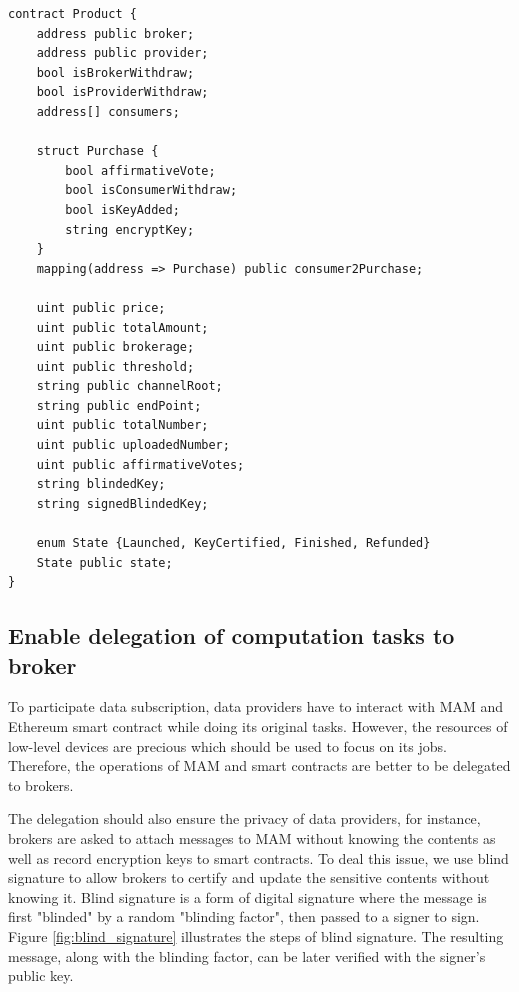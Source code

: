 \documentclass[conference]{IEEEtran}
\begin{document}
\lstset{style=solidity}
\begin{lstlisting}[caption={Product Contract data fields}, label={lst:constructor}, frame=single]
contract Product {
    address public broker;
    address public provider;
    bool isBrokerWithdraw;
    bool isProviderWithdraw;
    address[] consumers;
    
    struct Purchase {
        bool affirmativeVote;
        bool isConsumerWithdraw;
        bool isKeyAdded;
        string encryptKey;
    }
    mapping(address => Purchase) public consumer2Purchase;
    
    uint public price;
    uint public totalAmount;
    uint public brokerage;
    uint public threshold;
    string public channelRoot;
    string public endPoint;
    uint public totalNumber;
    uint public uploadedNumber;
    uint public affirmativeVotes;
    string blindedKey;
    string signedBlindedKey;
    
    enum State {Launched, KeyCertified, Finished, Refunded}
    State public state;
}
\end{lstlisting}


\subsection{Enable delegation of computation tasks to broker}
To participate data subscription, data providers have to interact with MAM and Ethereum smart contract while doing its original tasks. However, the resources of low-level devices are precious which should be used to focus on its jobs. Therefore, the operations of MAM and smart contracts are better to be delegated to brokers. 

The delegation should also ensure the privacy of data providers, for instance, brokers are asked to attach messages to MAM without knowing the contents as well as record encryption keys to smart contracts. To deal this issue, we use blind signature\cite{blindSig} to allow brokers to certify and update the sensitive contents without knowing it. Blind signature is a form of digital signature where the message is first "blinded" by a random "blinding factor", then passed to a signer to sign. Figure \ref{fig:blind_signature} illustrates the steps of blind signature. The resulting message, along with the blinding factor, can be later verified with the signer's public key. 
\end{document}
